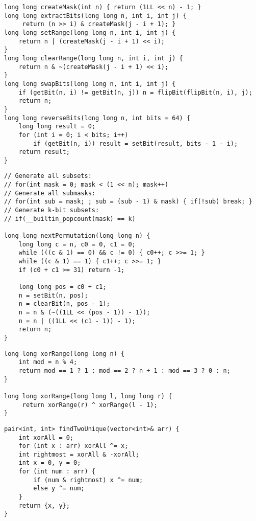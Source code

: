 \documentclass[11pt,a4paper]{article}
\begin{document}
\begin{lstlisting}[caption={Bitmask Patterns}]
long long createMask(int n) { return (1LL << n) - 1; }
long long extractBits(long long n, int i, int j) {
     return (n >> i) & createMask(j - i + 1); }
long long setRange(long long n, int i, int j) { 
    return n | (createMask(j - i + 1) << i); 
}
long long clearRange(long long n, int i, int j) { 
    return n & ~(createMask(j - i + 1) << i); 
}
long long swapBits(long long n, int i, int j) {
    if (getBit(n, i) != getBit(n, j)) n = flipBit(flipBit(n, i), j);
    return n;
}
long long reverseBits(long long n, int bits = 64) {
    long long result = 0;
    for (int i = 0; i < bits; i++) 
        if (getBit(n, i)) result = setBit(result, bits - 1 - i);
    return result;
}
\end{lstlisting}

\newpage

\begin{lstlisting}[caption={Subset Generation}]
// Generate all subsets: 
// for(int mask = 0; mask < (1 << n); mask++)
// Generate all submasks: 
// for(int sub = mask; ; sub = (sub - 1) & mask) { if(!sub) break; }
// Generate k-bit subsets: 
// if(__builtin_popcount(mask) == k)

long long nextPermutation(long long n) {
    long long c = n, c0 = 0, c1 = 0;
    while (((c & 1) == 0) && c != 0) { c0++; c >>= 1; }
    while ((c & 1) == 1) { c1++; c >>= 1; }
    if (c0 + c1 >= 31) return -1;
    
    long long pos = c0 + c1;
    n = setBit(n, pos);
    n = clearBit(n, pos - 1);
    n = n & (~((1LL << (pos - 1)) - 1));
    n = n | ((1LL << (c1 - 1)) - 1);
    return n;
}
\end{lstlisting}

\begin{lstlisting}[caption={XOR Range}]
long long xorRange(long long n) {
    int mod = n % 4;
    return mod == 1 ? 1 : mod == 2 ? n + 1 : mod == 3 ? 0 : n;
}

long long xorRange(long long l, long long r) {
     return xorRange(r) ^ xorRange(l - 1); 
}

\end{lstlisting}

\begin{lstlisting}[caption={Find Two Unique Numbers}]
pair<int, int> findTwoUnique(vector<int>& arr) {
    int xorAll = 0;
    for (int x : arr) xorAll ^= x;
    int rightmost = xorAll & -xorAll;
    int x = 0, y = 0;
    for (int num : arr) {
        if (num & rightmost) x ^= num;
        else y ^= num;
    }
    return {x, y};
}
\end{lstlisting}
\end{document}
